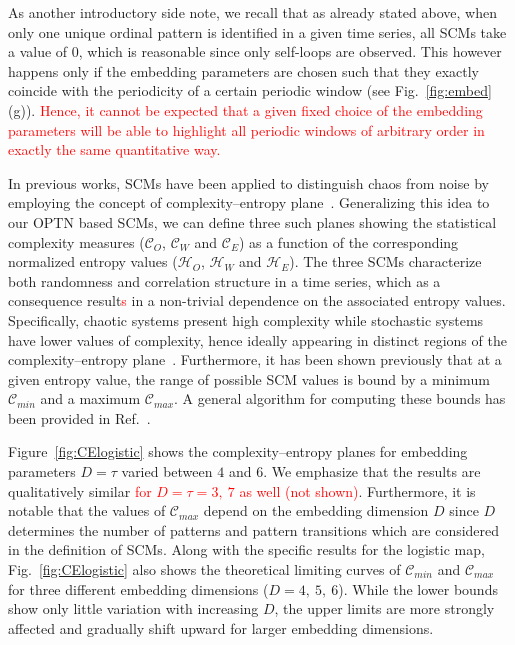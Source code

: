 \documentclass[aip,cha,reprint,nofootinbib]{revtex4-1}
\begin{document}
{As another introductory side note, we recall that as} already stated above, when only one unique ordinal pattern is identified in a given time series, all SCMs take a value of $0$, which is reasonable since only self-loops are observed. This however happens only if the embedding parameters are chosen such that they exactly coincide with the periodicity of a certain periodic window (see Fig.~\ref{fig:embed}(g)). \textcolor{red}{Hence, it cannot be expected that a given fixed choice of the embedding parameters will be able to highlight all periodic windows of arbitrary order in exactly the same quantitative way.}

In previous works, SCMs have been applied to distinguish chaos from noise by employing the concept of complexity--entropy plane~\cite{rossoPRL2007}. Generalizing this idea to our OPTN based SCMs, we can define three such planes showing the statistical complexity measures ($\mathcal{C}_O$, $\mathcal{C}_W$ and $\mathcal{C}_E$) as a function of the corresponding normalized entropy values ($\mathcal{H}_O$, $\mathcal{H}_W$ and $\mathcal{H}_E$). The three SCMs characterize both randomness and correlation structure in a time series, which as a consequence result\textcolor{red}{s} in a non-trivial dependence on the associated entropy values. Specifically, chaotic systems present high complexity while stochastic systems have lower values of complexity, hence ideally appearing in distinct regions of the complexity--entropy plane~\cite{rossoPRL2007}. Furthermore, {\color{red}it has been shown previously that at a given entropy value,} the range of possible SCM values is bound by a minimum $\mathcal{C}_{min}$ and a maximum $\mathcal{C}_{max}$. A general algorithm for computing these bounds has been provided in Ref.~\cite{martinPhyA2006}. 

Figure~\ref{fig:CElogistic} shows the complexity--entropy planes for embedding parameters $D = \tau$ varied between $4$ and $6$. We emphasize that the results are qualitatively similar \textcolor{red}{for $D=\tau=3,\ 7$ as well (not shown)}. Furthermore, it is notable that the values of $\mathcal{C}_{max}$ depend on the embedding dimension $D$ since $D$ determines the number of patterns and pattern transitions which are considered in the definition of SCMs. {\color{red}Along with the specific results for the logistic map, Fig.~\ref{fig:CElogistic} also shows the theoretical limiting curves of $\mathcal{C}_{min}$ and $\mathcal{C}_{max}$ for three different embedding dimensions ($D=4,\ 5,\ 6$). While the lower bounds show only little variation with increasing $D$, the upper limits are more strongly affected and gradually shift upward for larger embedding dimensions.}
\end{document}
